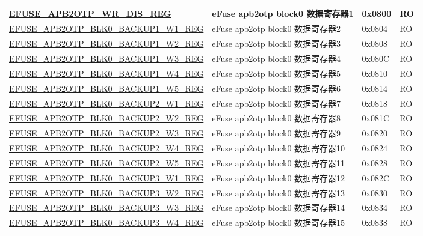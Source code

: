 \begin{longtable}{ | p{7cm} | p{6cm} | p{1.2cm} | p{1.5cm} | }
{\hyperref[regdesc:EFUSEAPB2OTPWRDISREG]{EFUSE\_APB2OTP\_WR\_DIS\_REG}} & eFuse apb2otp block0 数据寄存器1 & 0x0800 & RO \\\hline
\hyperref[regdesc:EFUSEAPB2OTPBLK0BACKUP1WNREG]{EFUSE\_APB2OTP\_BLK0\_BACKUP1\_W1\_REG} & eFuse apb2otp block0 数据寄存器2 & 0x0804 & RO \\\hline
\hyperref[regdesc:EFUSEAPB2OTPBLK0BACKUP1WNREG]{EFUSE\_APB2OTP\_BLK0\_BACKUP1\_W2\_REG} & eFuse apb2otp block0 数据寄存器3 & 0x0808 & RO \\\hline
\hyperref[regdesc:EFUSEAPB2OTPBLK0BACKUP1WNREG]{EFUSE\_APB2OTP\_BLK0\_BACKUP1\_W3\_REG} & eFuse apb2otp block0 数据寄存器4 & 0x080C & RO \\\hline
\hyperref[regdesc:EFUSEAPB2OTPBLK0BACKUP1WNREG]{EFUSE\_APB2OTP\_BLK0\_BACKUP1\_W4\_REG} & eFuse apb2otp block0 数据寄存器5 & 0x0810 & RO \\\hline
\hyperref[regdesc:EFUSEAPB2OTPBLK0BACKUP1WNREG]{EFUSE\_APB2OTP\_BLK0\_BACKUP1\_W5\_REG} & eFuse apb2otp block0 数据寄存器6 & 0x0814 & RO \\\hline
\hyperref[regdesc:EFUSEAPB2OTPBLK0BACKUP2WNREG]{EFUSE\_APB2OTP\_BLK0\_BACKUP2\_W1\_REG} & eFuse apb2otp block0 数据寄存器7 & 0x0818 & RO \\\hline
\hyperref[regdesc:EFUSEAPB2OTPBLK0BACKUP2WNREG]{EFUSE\_APB2OTP\_BLK0\_BACKUP2\_W2\_REG} & eFuse apb2otp block0 数据寄存器8 & 0x081C & RO \\\hline
\hyperref[regdesc:EFUSEAPB2OTPBLK0BACKUP2WNREG]{EFUSE\_APB2OTP\_BLK0\_BACKUP2\_W3\_REG} & eFuse apb2otp block0 数据寄存器9 & 0x0820 & RO \\\hline
\hyperref[regdesc:EFUSEAPB2OTPBLK0BACKUP2WNREG]{EFUSE\_APB2OTP\_BLK0\_BACKUP2\_W4\_REG} & eFuse apb2otp block0 数据寄存器10 & 0x0824 & RO \\\hline
\hyperref[regdesc:EFUSEAPB2OTPBLK0BACKUP2WNREG]{EFUSE\_APB2OTP\_BLK0\_BACKUP2\_W5\_REG} & eFuse apb2otp block0 数据寄存器11 & 0x0828 & RO \\\hline
\hyperref[regdesc:EFUSEAPB2OTPBLK0BACKUP3WNREG]{EFUSE\_APB2OTP\_BLK0\_BACKUP3\_W1\_REG} & eFuse apb2otp block0 数据寄存器12 & 0x082C & RO \\\hline
\hyperref[regdesc:EFUSEAPB2OTPBLK0BACKUP3WNREG]{EFUSE\_APB2OTP\_BLK0\_BACKUP3\_W2\_REG} & eFuse apb2otp block0 数据寄存器13 & 0x0830 & RO \\\hline
\hyperref[regdesc:EFUSEAPB2OTPBLK0BACKUP3WNREG]{EFUSE\_APB2OTP\_BLK0\_BACKUP3\_W3\_REG} & eFuse apb2otp block0 数据寄存器14 & 0x0834 & RO \\\hline
\hyperref[regdesc:EFUSEAPB2OTPBLK0BACKUP3WNREG]{EFUSE\_APB2OTP\_BLK0\_BACKUP3\_W4\_REG} & eFuse apb2otp block0 数据寄存器15 & 0x0838 & RO \\\hline

\end{longtable}

